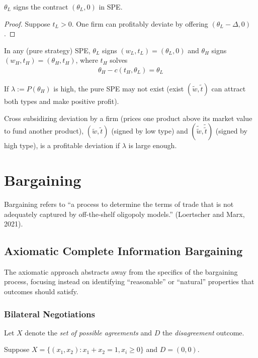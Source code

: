 \documentclass[11pt]{elegantbook_2}
\begin{document}
\begin{lemma}
    $\theta_L$ signs the contract $(\theta_L,0)$ in SPE.
\end{lemma}
\begin{proof}
    Suppose $t_L>0$. One firm can profitably deviate by offering $(\theta_L-\Delta,0)$.
\end{proof}

\begin{proposition}
    In any (pure strategy) SPE, $\theta_L$ signs $(w_L,t_L)=(\theta_L,0)$ and $\theta_H$ signs $(w_H,t_H)=(\theta_H,t_H)$, where $t_H$ solves
    \begin{equation}
        \begin{aligned}
            \theta_H-c(t_H,\theta_L)=\theta_L
        \end{aligned}
        \nonumber
    \end{equation}
\end{proposition}

If $\lambda:=P(\theta_H)$ is high, the pure SPE may not exist (exist $(\tilde{w},\tilde{t})$ can attract both types and make positive profit).

Cross subsidizing deviation by a firm (prices one product above its market value to fund another product), $(\tilde{w},\tilde{t})$ (signed by low type) and $(\tilde{\tilde{w}},\tilde{\tilde{t}})$ (signed by high type), is a profitable deviation if $\lambda$ is large enough.


\chapter{Bargaining}
Bargaining refers to “a process to determine the terms of trade that is not adequately captured by off-the-shelf oligopoly models.” (Loertscher and Marx, 2021).

\section{Axiomatic Complete Information Bargaining}
The axiomatic approach abstracts away from the specifics of the bargaining process, focusing instead on identifying ``reasonable” or ``natural” properties that outcomes should satisfy.

\subsection{Bilateral Negotiations}
Let $X$ denote the \textit{set of possible agreements} and $D$ the \textit{disagreement} outcome.
\begin{example}
    Suppose $X=\{(x_1,x_2):x_1+x_2=1, x_i\geq 0\}$ and $D=(0,0)$.
\end{example}
\end{document}
